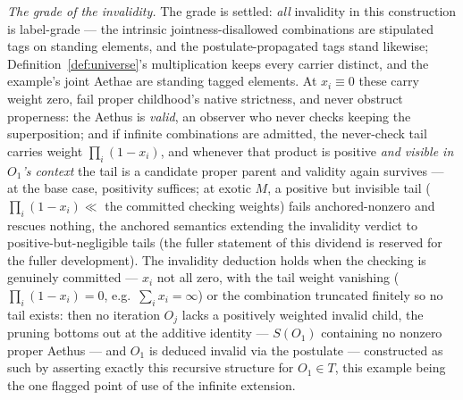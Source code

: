 \textit{The grade of the invalidity.} The grade is settled: \emph{all} invalidity in this construction is label-grade --- the intrinsic jointness-disallowed combinations are stipulated tags on standing elements, and the postulate-propagated tags stand likewise; Definition~\ref{def:universe}'s multiplication keeps every carrier distinct, and the example's joint Aethae are standing tagged elements. At $x_i \equiv 0$ these carry weight zero, fail proper childhood's native strictness, and never obstruct properness: the Aethus is \emph{valid}, an observer who never checks keeping the superposition; and if infinite combinations are admitted, the never-check tail carries weight $\prod_i (1 - x_i)$, and whenever that product is positive \emph{and visible in $O_1$'s context} the tail is a candidate proper parent and validity again survives --- at the base case, positivity suffices; at exotic $M$, a positive but invisible tail ($\prod_i (1 - x_i) \ll$ the committed checking weights) fails anchored-nonzero and rescues nothing, the anchored semantics extending the invalidity verdict to positive-but-negligible tails (the fuller statement of this dividend is reserved for the fuller development). The invalidity deduction holds when the checking is genuinely committed --- $x_i$ not all zero, with the tail weight vanishing ($\prod_i (1 - x_i) = 0$, e.g.\ $\sum_i x_i = \infty$) or the combination truncated finitely so no tail exists: then no iteration $O_j$ lacks a positively weighted invalid child, the pruning bottoms out at the additive identity --- $S(O_1)$ containing no nonzero proper Aethus --- and $O_1$ is deduced invalid via the postulate --- constructed as such by asserting exactly this recursive structure for $O_1 \in T$, this example being the one flagged point of use of the infinite extension.

